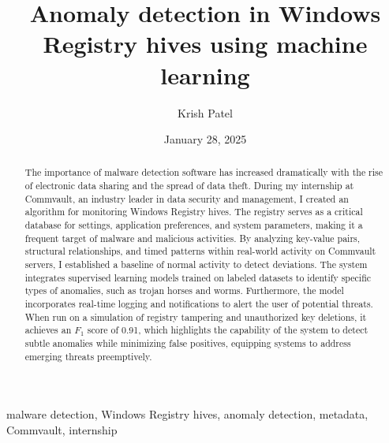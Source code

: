 ﻿\documentclass[12pt,conference,onecolumn]{IEEEtran}
\title{Anomaly detection in Windows Registry hives using machine learning}
\author{Krish Patel}
\date{January 28, 2025}
\begin{document}
\maketitle 

\begin{abstract}
The importance of malware detection software has increased dramatically with the rise of electronic data sharing and the spread of data theft. During my internship at Commvault, an industry leader in data security and management, I created an algorithm for monitoring Windows Registry hives. The registry serves as a critical database for settings, application preferences, and system parameters, making it a frequent target of malware and malicious activities. By analyzing key-value pairs, structural relationships, and timed patterns within real-world activity on Commvault servers, I established a baseline of normal activity to detect deviations. The system integrates supervised learning models trained on labeled datasets to identify specific types of anomalies, such as trojan horses and worms. Furthermore, the model incorporates real-time logging and notifications to alert the user of potential threats. When run on a simulation of registry tampering and unauthorized key deletions, it achieves an $F_1$ score of 0.91, which highlights the capability of the system to detect subtle anomalies while minimizing false positives, equipping systems to address emerging threats preemptively.
\end{abstract}

\begin{IEEEkeywords}
malware detection, Windows Registry hives, anomaly detection, metadata, Commvault, internship
\end{IEEEkeywords}
\end{document}
